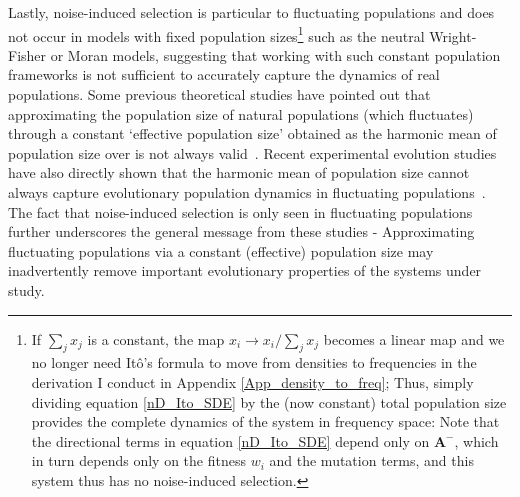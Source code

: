 Lastly, noise-induced selection is particular to fluctuating populations and does not occur in models with fixed population sizes\footnote{If $\sum_j x_j$ is a constant, the map $x_i \to x_i/\sum_j x_j$ becomes a linear map and we no longer need It\^o's formula to move from densities to frequencies in the derivation I conduct in Appendix \ref{App_density_to_freq}; Thus, simply dividing equation \eqref{nD_Ito_SDE} by the (now constant) total population size provides the complete dynamics of the system in frequency space: Note that the directional terms in equation \eqref{nD_Ito_SDE} depend only on $\mathbf{A}^-$, which in turn depends only on the fitness $w_i$ and the mutation terms, and this system thus has no noise-induced selection.} such as the neutral Wright-Fisher or Moran models, suggesting that working with such constant population frameworks is not sufficient to accurately capture the dynamics of real populations. Some previous theoretical studies have pointed out that approximating the population size of natural populations (which fluctuates) through a constant `effective population size' obtained as the harmonic mean of population size over is not always valid~\citep{sjodin_meaning_2005,abu_awad_effects_2018,kuosmanen_turnover_2022}. Recent experimental evolution studies have also directly shown that the harmonic mean of population size cannot always capture evolutionary population dynamics in fluctuating populations~\citep{chavhan_larger_2019}. The fact that noise-induced selection is only seen in fluctuating populations further underscores the general message from these studies - Approximating fluctuating populations via a constant (effective) population size may inadvertently remove important evolutionary properties of the systems under study.

